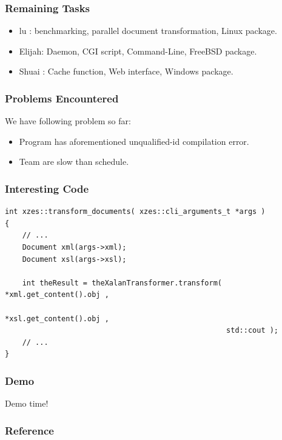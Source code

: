 \documentclass{beamer}
\begin{document}
\begin{frame}
  \frametitle{Remaining Tasks}
  \begin{itemize}
    \item lu    : benchmarking, parallel document transformation, Linux package.
    \item Elijah: Daemon, CGI script, Command-Line, FreeBSD package.
    \item Shuai : Cache function, Web interface, Windows package.
  \end{itemize}
\end{frame}

\begin{frame}
  \frametitle{Problems Encountered}
  We have following problem so far:
  \begin{itemize}
    \item Program has aforementioned unqualified-id compilation error. 
    \item Team are slow than schedule.
  \end{itemize}
\end{frame}

\begin{frame}[fragile]
  \frametitle{Interesting Code}
  \begin{lstlisting}
int xzes::transform_documents( xzes::cli_arguments_t *args )
{
    // ...
    Document xml(args->xml);
    Document xsl(args->xsl);

    int theResult = theXalanTransformer.transform( *xml.get_content().obj ,
                                                   *xsl.get_content().obj ,
                                                   std::cout );
    // ...
}
  \end{lstlisting}
\end{frame}

\begin{frame}
  \frametitle{Demo}
  Demo time!
\end{frame}

\begin{frame}
  \frametitle{Reference}
    \printbibliography
\end{frame}
\end{document}
